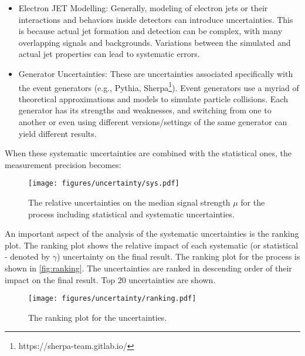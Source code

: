 \begin{itemize}
    \item Electron JET Modelling: Generally, modeling of electron jets or their interactions and behaviors inside
          detectors can introduce uncertainties. This is because actual jet formation and detection can be complex, with
          many overlapping signals and backgrounds. Variations between the simulated and actual jet properties can lead
          to systematic errors.

    \item Generator Uncertainties: These are uncertainties associated specifically with the event generators (e.g.,
          Pythia, Sherpa\footnote{https://sherpa-team.gitlab.io/}). Event generators use a myriad of theoretical
          approximations and models to simulate particle collisions. Each generator has its strengths and weaknesses,
          and switching from one to another or even using different versions/settings of the same generator can yield
          different results.
\end{itemize}

When these systematic uncertainties are combined with the statistical ones, the measurement precision becomes:

\begin{figure}[h]
    \centering
    \texttt{[image: figures/uncertainty/sys.pdf]}
    \caption{The relative uncertainties on the median signal strength $\mu$ for the \tth process including statistical
        and systematic uncertainties.}
    \label{fig:sys}
\end{figure}

An important aspect of the analysis of the systematic uncertainties is the ranking plot. The ranking plot shows the
relative impact of each systematic (or statistical - denoted by $\gamma$) uncertainty on the final result.
The ranking plot for the \tth process is shown in \autoref{fig:ranking}. The uncertainties are ranked in descending
order of their impact on the final result. Top 20 uncertainties are shown.

\begin{figure}[h]
    \centering
    \texttt{[image: figures/uncertainty/ranking.pdf]}
    \caption[The ranking plot for the uncertainties.]{The ranking plot for the uncertainties.}
    \label{fig:ranking}
\end{figure}